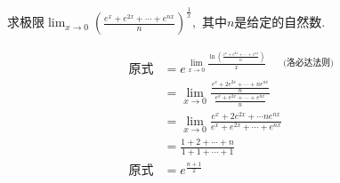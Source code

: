 \documentclass[12pt, a4paper, oneside, UTF8]{ctexbook}
\begin{document}
\begin{sloppypar}
              \begin{problem}
              求极限$\lim_{x\to0}\left(\frac{e^x+e^{2x}+\cdots+e^{nx}}n\right)^{\frac{1}{x}},$ 其中$n$是给定的自然数.
              \end{problem}
              \begin{solution}
                  \begin{align*}
                      \text{原式} & = e^{\lim_{x \to 0} \frac{\ln \left(\frac{e^x+e^{2x}+\cdots+e^{nx}}n\right)}{x}\qquad \text{(洛必达法则)} } \\
                                & =\lim_{x\to0}\frac{\frac{e^{x}+2e^{2x}+\cdots+ne^{nx}}{n}}{\frac{e^{x}+e^{2x}+\cdots+e^{nx}}{n}}       \\
                                & = \lim_{x\to0}\frac{e^{x}+2e^{2x}+\cdots ne^{nx}}{e^{x}+e^{2x}+\cdots+e^{nx}}                          \\
                                & =\frac{1+2+\cdots+n}{1+1+\cdots+1}                                                                     \\
                      \text{原式} & = e^{\frac{n+1}{2}}
                  \end{align*}
              \end{solution}

\end{sloppypar}
\end{document}

